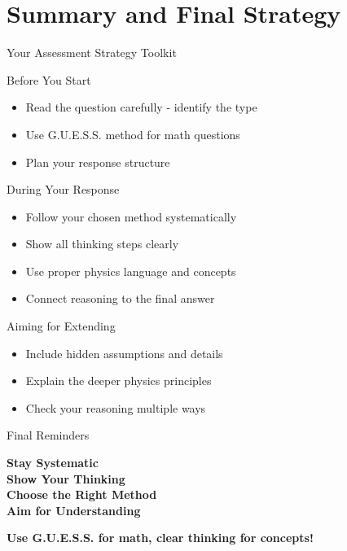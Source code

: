 \documentclass{beamer}
\begin{document}
\section{Summary and Final Strategy}

\begin{frame}{Your Assessment Strategy Toolkit}
\begin{block}{Before You Start}
\begin{itemize}
\item Read the question carefully - identify the type \pause
\item Use G.U.E.S.S. method for math questions \pause
\item Plan your response structure
\end{itemize}
\end{block}

\pause
\begin{block}{During Your Response}
\begin{itemize}
\item Follow your chosen method systematically \pause
\item Show all thinking steps clearly \pause
\item Use proper physics language and concepts \pause
\item Connect reasoning to the final answer
\end{itemize}
\end{block}

\pause
\begin{block}{Aiming for Extending}
\begin{itemize}
\item Include hidden assumptions and details \pause
\item Explain the deeper physics principles \pause
\item Check your reasoning multiple ways
\end{itemize}
\end{block}
\end{frame}

\begin{frame}{Final Reminders}
\begin{center}
\Large
\textcolor{ds9blue}{\textbf{Stay Systematic}} \\
\vspace{0.3cm}
\textcolor{ds9gold}{\textbf{Show Your Thinking}} \\
\vspace{0.3cm}
\textcolor{ds9blue}{\textbf{Choose the Right Method}} \\
\vspace{0.3cm}
\textcolor{ds9red}{\textbf{Aim for Understanding}} \\
\end{center}

\vspace{1cm}

\begin{center}
\textbf{Use G.U.E.S.S. for math, clear thinking for concepts!}
\end{center}
\end{frame}
\end{document}
